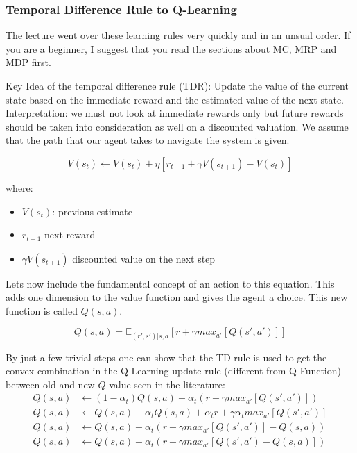 \documentclass[main]{subfiles}
\begin{document}
\subsubsection{Temporal Difference Rule to Q-Learning}
The lecture went over these learning rules very quickly and in an unsual order. If you are a beginner, I suggest that you read the sections about MC, MRP and MDP first.

Key Idea of the temporal difference rule (TDR): 
Update the value of the current state based on the immediate reward and the estimated value of the next state. 
Interpretation: we must not look at immediate rewards only but future rewards should be taken into consideration as well on a discounted valuation. 
We assume that the path that our agent takes to navigate the system is given.


\begin{equation}
    V(s_{t}) \leftarrow V(s_t) + \eta[r_{t+1} + \gamma V(s_{t+1}) - V(s_t) ]
\end{equation}

where:

\begin{itemize}
    \item $V(s_t)$: previous estimate
    \item $r_{t+1}$ next reward
    \item $\gamma V(s_{t+1})$ discounted value on the next step
\end{itemize}

Lets now include the fundamental concept of an action to this equation. This adds one dimension to the value function and gives the agent a choice. This new function is called $Q(s,a)$. 

\begin{equation}
Q(s,a) = \mathbb{E}_{(r',s')|s,a}[r+ \gamma  max_{a'}[Q(s',a')]]
\end{equation}
 
By just a few trivial steps one can show that the TD rule is used to get the convex combination in the Q-Learning update rule (different from Q-Function) between old and new $Q$ value seen in the literature:
\begin{align}
Q(s,a)& \leftarrow (1-\alpha_t)Q(s,a) + \alpha_t(r+\gamma max_{a'}[Q(s',a')]) \\
Q(s,a)& \leftarrow Q(s,a) - \alpha_t Q(s,a)  + \alpha_t r + \gamma \alpha_t max_{a'}[Q(s',a')] \\
Q(s,a)& \leftarrow Q(s,a) + \alpha_t (r + \gamma max_{a'}[Q(s',a')] - Q(s,a)) \\
Q(s,a)& \leftarrow Q(s,a) + \alpha_t (r + \gamma max_{a'}[Q(s',a') - Q(s,a)])
\end{align}
\end{document}
